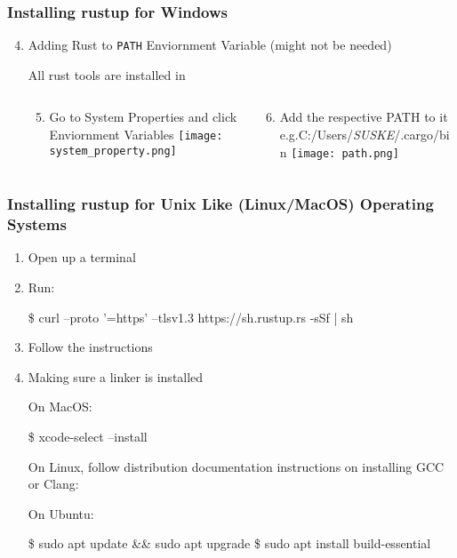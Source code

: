 \documentclass{beamer}
\begin{document}
\begin{frame}
  \frametitle{Installing rustup for Windows}
  \begin{enumerate}
          \setcounter{enumi}{3}
    \item<+->{Adding Rust to \lstinline[backgroundcolor=backcolour]{PATH} Enviornment Variable (might not be needed)

          All rust tools are installed in 
          }
          \begin{columns}[t]
              \begin{column}{.5\linewidth}
                \begin{enumerate}
                        \setcounter{enumii}{4}
                  \item<+->{Go to System Properties and click Enviornment Variables}
                        \texttt{[image: system\_property.png]}
                \end{enumerate}
              \end{column}
              \begin{column}{.5\linewidth}
                \begin{enumerate}
                        \setcounter{enumii}{5}
                  \item<+->{Add the respective PATH to it e.g.C:/Users/\emph{SUSKE}/.cargo/bin}
                        \texttt{[image: path.png]}
                \end{enumerate}
              \end{column}
          \end{columns}
  \end{enumerate}
\end{frame}


\begin{frame}[fragile]
  \frametitle{Installing rustup for Unix Like (Linux/MacOS) Operating Systems}
  \begin{enumerate}
    \item{Open up a terminal}
    \item{Run:

\begin{semiverbatim}
\$ curl --proto '=https' --tlsv1.3 https://sh.rustup.rs -sSf
 | sh
\end{semiverbatim}
          }
    \item{Follow the instructions}
    \item{Making sure a linker is installed

          On MacOS:\@
\begin{semiverbatim}
\$ xcode-select --install
\end{semiverbatim}

          On Linux, follow distribution documentation instructions on installing GCC or Clang:

          On Ubuntu:
\begin{semiverbatim}
\$ sudo apt update \&\& sudo apt upgrade
\$ sudo apt install build-essential
\end{semiverbatim}
          }
  \end{enumerate}
\end{frame}
\end{document}
